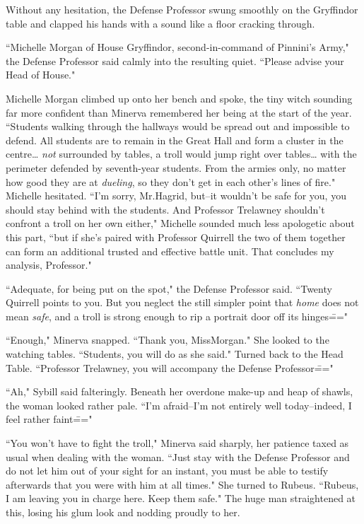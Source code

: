 Without any hesitation, the Defense Professor swung smoothly on the Gryffindor table and clapped his hands with a sound like a floor cracking through.

``Michelle Morgan of House Gryffindor, second-in-command of Pinnini's Army," the Defense Professor said calmly into the resulting quiet. ``Please advise your Head of House."

Michelle Morgan climbed up onto her bench and spoke, the tiny witch sounding far more confident than Minerva remembered her being at the start of the year. ``Students walking through the hallways would be spread out and impossible to defend. All students are to remain in the Great Hall and form a cluster in the centre{\ldots} \emph{not} surrounded by tables, a troll would jump right over tables{\ldots} with the perimeter defended by seventh-year students. From the armies only, no matter how good they are at \emph{dueling}, so they don't get in each other's lines of fire." Michelle hesitated. ``I'm sorry, Mr.\?Hagrid, but\---it wouldn't be safe for you, you should stay behind with the students. And Professor Trelawney shouldn't confront a troll on her own either," Michelle sounded much less apologetic about this part, ``but if she's paired with Professor Quirrell the two of them together can form an additional trusted and effective battle unit. That concludes my analysis, Professor."

``Adequate, for being put on the spot," the Defense Professor said. ``Twenty Quirrell points to you. But you neglect the still simpler point that \emph{home} does not mean \emph{safe}, and a troll is strong enough to rip a portrait door off its hinges\==="

``Enough," Minerva snapped. ``Thank you, Miss\?Morgan." She looked to the watching tables. ``Students, you will do as she said." Turned back to the Head Table. ``Professor Trelawney, you will accompany the Defense Professor\==="

``Ah," Sybill said falteringly. Beneath her overdone make-up and heap of shawls, the woman looked rather pale. ``I'm afraid\---I'm not entirely well today\---indeed, I feel rather faint\==="

``You won't have to fight the troll," Minerva said sharply, her patience taxed as usual when dealing with the woman. ``Just stay with the Defense Professor and do not let him out of your sight for an instant, you must be able to testify afterwards that you were with him at all times." She turned to Rubeus. ``Rubeus, I am leaving you in charge here. Keep them safe." The huge man straightened at this, losing his glum look and nodding proudly to her.

